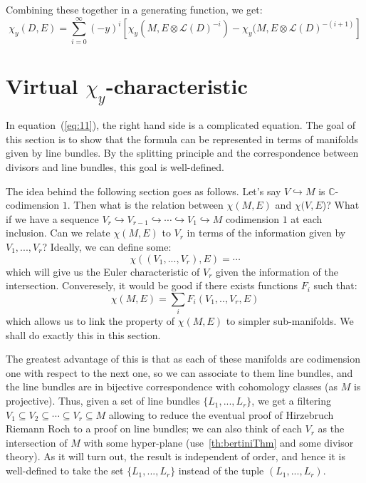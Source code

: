 \documentclass{book}
\newcommand{\C}{{\mathbb{C}}}
\newcommand{\CL}{{\mathcal{L}}}
\newcommand{\sse}{\subseteq}
\begin{document}
Combining these together in a generating function, we get:
\begin{equation}\label{eq:11}
  \chi_y(D, E) = \sum_{i=0}^\infty (-y)^i [\chi_y(M, E\otimes \CL(D)^{-i}) - \chi_y (M, E\otimes
  \CL(D)^{-(i+1)}]
\end{equation}

\section{Virtual $\chi_y$-characteristic}\label{sec:virtualEulerChar}

In equation~(\ref{eq:11}), the right hand side is a complicated equation. The goal of this section is to show
that the formula can be represented in terms of manifolds given by line bundles. By the splitting principle
and the correspondence between divisors and line bundles, this goal is well-defined.

The idea behind the following section goes as follows. Let's say $V \hookrightarrow M$ is $\C$-codimension
$1$. Then what is the relation between $\chi(M, E)$ and $\chi(V, E$)? What if we have a sequence $V_r
\hookrightarrow V_{r-1} \hookrightarrow \cdots \hookrightarrow V_1 \hookrightarrow M$ codimension $1$ at
each inclusion. Can we relate $\chi(M, E)$ to $V_r$ in terms of the information given by $V_1, ..., V_r$? Ideally, we can define some:
\[
  \chi((V_1, ..., V_r), E) = \cdots
\]
which will give us the Euler characteristic of $V_r$ given the information of the intersection. Converesely,
it would be good if there exists functions $F_i$ such that:
\[
  \chi(M, E) = \sum_i F_i(V_1,.., V_r, E)
\]
which allows us to link the property of $\chi(M,E)$ to simpler sub-manifolds. We shall do exactly this in this
section.

The greatest advantage of this is that as each of these manifolds are codimension one with respect to the next
one, so we can associate to them line bundles, and the line bundles are in bijective correspondence with
cohomology classes (as $M$ is projective). Thus, given a set of line bundles $\{L_1, ..., L_r\}$, we get a
filtering $V_1 \sse V_2 \sse \cdots \sse V_r \sse M$ allowing to reduce the eventual proof of Hirzebruch
Riemann Roch to a proof on line bundles; we can also think of each $V_r$ as the intersection of $M$ with some
hyper-plane (use~\cref{th:bertiniThm} and some divisor theory). As it will turn out, the result is independent of order,
and hence it is well-defined to take the set $\{L_1, ..., L_r\}$ instead of the tuple $(L_1, ..., L_r)$.
\end{document}
